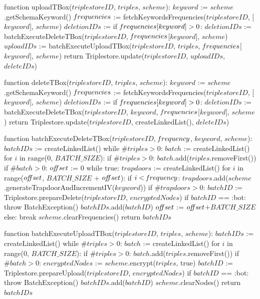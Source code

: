 function uploadTBox($triplestoreID$, $triples$, $scheme$):
    $keyword$ := $scheme$.getSchemaKeyword()
    $\textrm{\emph{f}}requencies$ := fetchKeywordsFrequencies($triplestoreID$, [$keyword$], $scheme$)
    $deletionIDs$ := {}
    if $\textrm{\emph{f}}requencies[keyword] > 0$:
        $deletionIDs$ := batchExecuteDeleteTBox($triplestoreID$, $\textrm{\emph{f}}requencies$[$keyword$], $scheme$)
    $uploadIDs$ := batchExecuteUploadTBox($triplestoreID$, $triples$, $\textrm{\emph{f}}requencies$[$keyword$], $scheme$)
    return Triplestore.update($triplestoreID$, $uploadIDs$, $deleteIDs$)

function deleteTBox($triplestoreID$, $triples$, $scheme$):
    $keyword$ := $scheme$.getSchemaKeyword()
    $\textrm{\emph{f}}requencies$ := fetchKeywordsFrequencies($triplestoreID$, [$keyword$], $scheme$)
    $deletionIDs$ := {}
    if $\textrm{\emph{f}}requencies[keyword] > 0$:
        $deletionIDs$ := batchExecuteDeleteTBox($triplestoreID$, $keyword$, $\textrm{\emph{f}}requencies$[$keyword$], $scheme$)
    return Triplestore.update($triplestoreID$, createLinkedList(), $deleteIDs$)

function batchExecuteDeleteTBox($triplestoreID$, $\textrm{\emph{f}}requency$, $keyword$, $scheme$):
    $batchIDs$ := createLinkedList()
    while $\#triples > 0$: 
        $batch$ := createLinkedList()
        for $i$ in range(0, $BATCH\_SIZE$):
            if $\#triples > 0$:
                $batch$.add($triples$.removeFirst())
        if $\#batch > 0$:
            $o\textrm{\emph{ff}}set$ := 0
            while true:
                $trapdoors$ := createLinkedList()       
                for $i$ in range($o\textrm{\emph{ff}}set$, $BATCH\_SIZE$ + $o\textrm{\emph{ff}}set$):
                    if $i < \textrm{\emph{f}}requency$:
                        $trapdoors$.add($scheme$.generateTrapdoorAndIncrementIV($keyword$))
                if $\#trapdoors > 0$:
                    $batchID$ := Triplestore.prepareDelete($triplestoreID$, $encryptedNodes$)
                    if $batchID$ == :bot:
                        throw BatchException()
                    $batchIDs$.add($batchID$)
                    $o\textrm{\emph{ff}}set$ := $o\textrm{\emph{ff}}set$$ + $$BATCH\_SIZE$
                else:
                    break
    $scheme$.clearFrequencies()
    return $batchIDs$

function batchExecuteUploadTBox($triplestoreID$, $triples$, $scheme$):
    $batchIDs$ := createLinkedList()
    while $\#triples > 0$: 
        $batch$ := createLinkedList()
        for $i$ in range(0, $BATCH\_SIZE$):
            if $\#triples > 0$:
                $batch$.add($triples$.removeFirst())
        if $\#batch > 0$:
            $encryptedNodes$ := $scheme$.encrypt($triples$, true)
            $batchID$ := Triplestore.prepareUpload($triplestoreID$, $encryptedNodes$)
            if $batchID$ == :bot:
                throw BatchException()
            $batchIDs$.add($batchID$)
        $scheme$.clearNodes()
    return $batchIDs$
